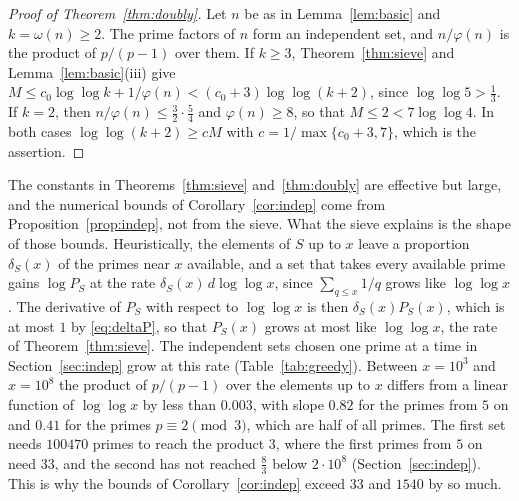 \documentclass[11pt,reqno]{amsart}
\numberwithin{equation}{section}
\theoremstyle{plain}
\theoremstyle{definition}
\theoremstyle{remark}
\begin{document}
\begin{proof}[Proof of Theorem~\ref{thm:doubly}]
Let $n$ be as in Lemma~\ref{lem:basic} and $k=\omega(n)\ge2$. The prime
factors of $n$ form an independent set, and $n/\varphi(n)$ is the
product of $p/(p-1)$ over them. If $k\ge3$, Theorem~\ref{thm:sieve} and
Lemma~\ref{lem:basic}(iii) give
$M\le c_0\log\log k+1/\varphi(n)<(c_0+3)\log\log(k+2)$, since
$\log\log5>\frac13$. If $k=2$, then $n/\varphi(n)\le\frac32\cdot\frac54$
and $\varphi(n)\ge8$, so that $M\le2<7\log\log4$. In both cases
$\log\log(k+2)\ge cM$ with $c=1/\max\{c_0+3,7\}$, which is the
assertion.
\end{proof}

The constants in Theorems~\ref{thm:sieve} and~\ref{thm:doubly} are
effective but large, and the numerical bounds of
Corollary~\ref{cor:indep} come from Proposition~\ref{prop:indep}, not
from the sieve. What the sieve explains is the shape of those bounds.
Heuristically, the elements of $S$ up to $x$ leave a proportion
$\delta_S(x)$ of the primes near $x$ available, and a set that takes
every available prime gains $\log P_S$ at the rate
$\delta_S(x)\,d\log\log x$, since $\sum_{q\le x}1/q$ grows like
$\log\log x$. The derivative of $P_S$ with respect to $\log\log x$ is
then $\delta_S(x)P_S(x)$, which is at most $1$ by \eqref{eq:deltaP},
so that $P_S(x)$ grows at most like $\log\log x$, the rate of
Theorem~\ref{thm:sieve}. The independent sets chosen one prime at a
time in Section~\ref{sec:indep} grow at this rate
(Table~\ref{tab:greedy}). Between $x=10^3$ and $x=10^8$ the product of
$p/(p-1)$ over the elements up to $x$ differs from a linear function of
$\log\log x$ by less than $0.003$, with slope $0.82$ for the primes
from $5$ on and $0.41$ for the primes $p\equiv2\pmod3$, which are
half of all primes. The first set needs $100470$ primes to reach the
product $3$, where the first primes from $5$ on need $33$, and the
second has not reached $\frac83$ below $2\cdot10^8$
(Section~\ref{sec:indep}). This is
why the bounds of Corollary~\ref{cor:indep} exceed $33$ and $1540$ by
so much.
\end{document}
